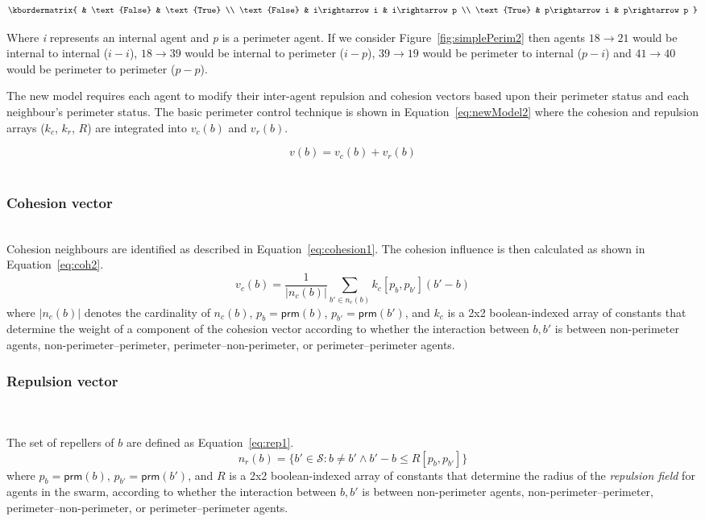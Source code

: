 \documentclass[12pt,a4paper]{IEEEtran}
\newcommand{\vbb}[2]{#2-#1}
\newcommand{\prm}{\mathsf{prm}}
\newcommand{\kc}{\mathit{k_c}}
\newcommand{\kr}{\mathit{k_r}}
\newcommand{\rb}{\mathit{R}}
\begin{document}
\[
  \kbordermatrix{
                   & \text{False} & \text{True} \\
    \text{False}   & i\rightarrow i   & i\rightarrow p  \\
    \text{True}    & p\rightarrow i   & p\rightarrow p
  }
\]

Where \emph{i} represents an internal agent and \emph{p} is a perimeter agent. If we consider Figure~\ref{fig:simplePerim2} then agents $18\rightarrow 21$ would be internal to internal ($i-i$), $18\rightarrow 39$ would be internal to perimeter ($i-p$), $39\rightarrow 19$ would be perimeter to internal ($p-i$) and $41\rightarrow 40$ would be perimeter to perimeter ($p-p$).

The new model requires each agent to modify their inter-agent repulsion and cohesion vectors based upon their perimeter status and each neighbour's perimeter status. The basic perimeter control technique is shown in Equation~\ref{eq:newModel2} where the cohesion and repulsion arrays ($\kc$, $\kr$, $\rb$) are integrated into $v_c(b)$ and $v_r(b)$.

\begin{equation}\label{eq:newModel2}
v(b) = v_c(b) + v_r(b)
\end{equation}\\

\subsubsection{Cohesion vector}~\\
Cohesion neighbours are identified as  described in Equation~\ref{eq:cohesion1}. The cohesion influence is then calculated as shown in Equation~\ref{eq:coh2}.
\begin{equation}\label{eq:coh2}
	v_c(b) = \frac{1}{|n_c(b)|} \sum_{b' \in n_c(b)} \kc[p_b, p_{b'}] (b' - b)
\end{equation}
where $|n_c(b)|$ denotes the cardinality of $n_c(b)$, $p_b = \prm(b)$, $p_{b'} 
= \prm(b')$, and 
$\kc$ is a 2x2 boolean-indexed array of constants that determine the weight
of a component of the cohesion vector according to
whether the interaction between $b,b'$ is between non-perimeter agents,
non-perimeter--perimeter, perimeter--non-perimeter, or perimeter--perimeter
agents.

\subsubsection{Repulsion vector}~\\
~\\
The set of repellers of $b$ are defined as Equation~\ref{eq:rep1}.
\small
\begin{equation}\label{eq:rep1}
	n_r(b) = \{b' \in \mathcal{S} : b \neq b' \wedge \vbb{b}{b'} \leq \rb[p_b,p_{b'}]\}
\end{equation}
\normalsize
where $p_b = \prm(b)$, $p_{b'} = \prm(b')$, and $\rb$ is a 2x2 boolean-indexed
array of constants that determine the radius of the \emph{repulsion field} for agents in the swarm, according to whether the interaction between $b,b'$ is between non-perimeter agents, non-perimeter--perimeter,
perimeter--non-perimeter, or perimeter--perimeter agents.\\
\end{document}
